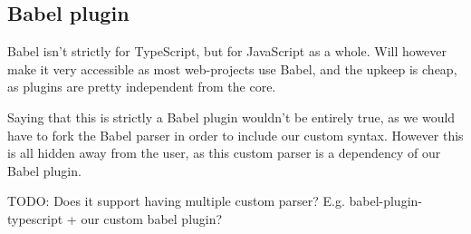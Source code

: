 \subsection{Babel plugin}\label{subsec:babel-plugin}

Babel isn't strictly for TypeScript, but for JavaScript as a whole.
Will however make it very accessible as most web-projects use Babel, and the upkeep is cheap, as plugins are pretty independent from the core.

Saying that this is strictly a Babel plugin wouldn't be entirely true, as we would have to fork the Babel parser in order to include our custom syntax\cite{babelparserdocs}.
However this is all hidden away from the user, as this custom parser is a dependency of our Babel plugin.

TODO: Does it support having multiple custom parser?
E.g. babel-plugin-typescript + our custom babel plugin?
